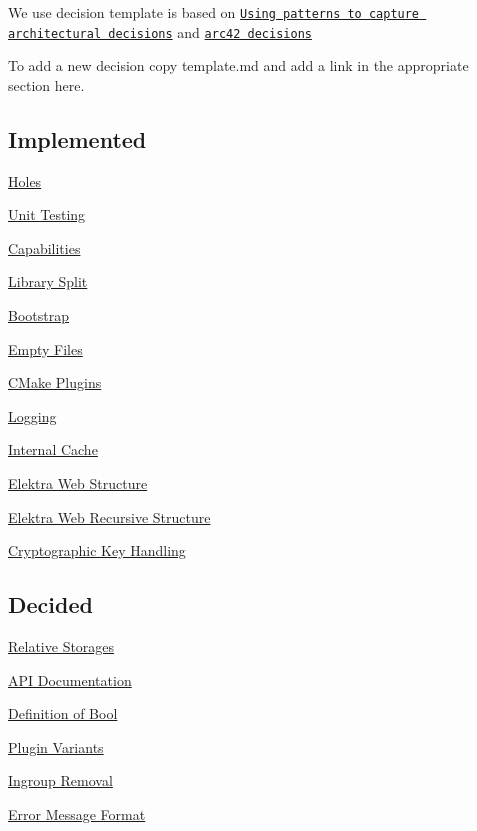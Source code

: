 We use decision template is based on \href{http://www.cs.rug.nl/~paris/papers/IEEESW07.pdf}{\tt Using patterns to capture architectural decisions} and \href{http://docs.arc42.org/section-9/}{\tt arc42 decisions}

To add a new decision copy template.\+md and add a link in the appropriate section here.

\subsection*{Implemented}


\begin{DoxyItemize}
\item \hyperlink{doc_decisions_holes_md}{Holes}
\item \hyperlink{doc_decisions_unit_testing_md}{Unit Testing}
\item \hyperlink{doc_decisions_capabilities_md}{Capabilities}
\item \hyperlink{doc_decisions_library_split_md}{Library Split}
\item \hyperlink{doc_decisions_bootstrap_md}{Bootstrap}
\item \hyperlink{doc_decisions_empty_files_md}{Empty Files}
\item \hyperlink{doc_decisions_cmake_plugins_md}{C\+Make Plugins}
\item \hyperlink{doc_decisions_logging_md}{Logging}
\item \hyperlink{doc_decisions_internal_cache_md}{Internal Cache}
\item \hyperlink{doc_decisions_elektra_web_md}{Elektra Web Structure}
\item \hyperlink{doc_decisions_elektra_web_recursive_md}{Elektra Web Recursive Structure}
\item \hyperlink{doc_decisions_cryptograhic_key_handling_md}{Cryptographic Key Handling}
\end{DoxyItemize}

\subsection*{Decided}


\begin{DoxyItemize}
\item \hyperlink{doc_decisions_relative_md}{Relative Storages}
\item \hyperlink{doc_decisions_api_documentation_md}{A\+PI Documentation}
\item \hyperlink{doc_decisions_bool_md}{Definition of Bool}
\item \hyperlink{doc_decisions_plugin_variants_md}{Plugin Variants}
\item \hyperlink{doc_decisions_ingroup_removal_md}{Ingroup Removal}
\item \hyperlink{doc_decisions_error_message_format_md}{Error Message Format}
\end{DoxyItemize}

